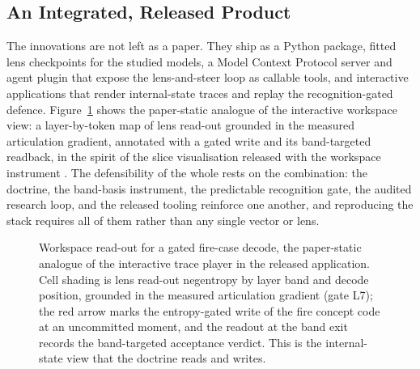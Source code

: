\subsection{An Integrated, Released Product}

The innovations are not left as a paper. They ship as a Python package, fitted lens checkpoints for the studied models, a Model Context Protocol server and agent plugin that expose the lens-and-steer loop as callable tools, and interactive applications that render internal-state traces and replay the recognition-gated defence. Figure~\ref{fig:thought} shows the paper-static analogue of the interactive workspace view: a layer-by-token map of lens read-out grounded in the measured articulation gradient, annotated with a gated write and its band-targeted readback, in the spirit of the slice visualisation released with the workspace instrument \cite{Anthropic2026Workspace,JacobianLens2026}. The defensibility of the whole rests on the combination: the doctrine, the band-basis instrument, the predictable recognition gate, the audited research loop, and the released tooling reinforce one another, and reproducing the stack requires all of them rather than any single vector or lens.

\begin{figure}[t]
\centering
\resizebox{0.92\columnwidth}{!}{}
\caption{Workspace read-out for a gated fire-case decode, the paper-static analogue of the interactive trace player in the released application. Cell shading is lens read-out negentropy by layer band and decode position, grounded in the measured articulation gradient (gate L7); the red arrow marks the entropy-gated write of the fire concept code at an uncommitted moment, and the readout at the band exit records the band-targeted acceptance verdict. This is the internal-state view that the doctrine reads and writes.}
\label{fig:thought}
\end{figure}